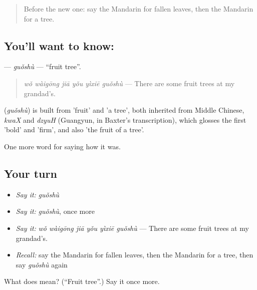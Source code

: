 \label{lesson:ZH-C516-guoshu}



\begin{quote}
Before the new one: say the Mandarin for fallen leaves, then the Mandarin for a tree.
\end{quote}

\subsection*{You'll want to know: }
\textbf{} — \emph{guǒshù} — \textquotedblleft{}fruit tree\textquotedblright{}.

\begin{quote}
\textbf{} \emph{wǒ wàigōng jiā yǒu yìxiē guǒshù} — There are some fruit trees at my grandad's.
\end{quote}

\begin{cousinweb}
\textbf{} (\emph{guǒshù}) is built from  'fruit' and  'a tree', both inherited from Middle Chinese, \emph{kwaX} and \emph{dzyuH} (Guangyun, in Baxter's transcription), which glosses the first 'bold' and 'firm', and also 'the fruit of a tree'.
\end{cousinweb}

\begin{grammarlens}[title={What you've built}]
One more word for saying how it was.
\end{grammarlens}

\subsection*{Your turn}
\begin{itemize}
\raggedright
  \item \emph{Say it:} \emph{guǒshù}
  \item \emph{Say it:} \emph{guǒshù}, once more
  \item \emph{Say it:} \emph{wǒ wàigōng jiā yǒu yìxiē guǒshù} — There are some fruit trees at my grandad's.
  \item \emph{Recall:} say the Mandarin for fallen leaves, then the Mandarin for a tree, then say \emph{guǒshù} again
\end{itemize}

\begin{tcolorbox}[breakable,colback=teal!4,colframe=teal!35!black,title={Before you move on}]
What does  mean? (\textquotedblleft{}Fruit tree\textquotedblright{}.) Say it once more.
\end{tcolorbox}
